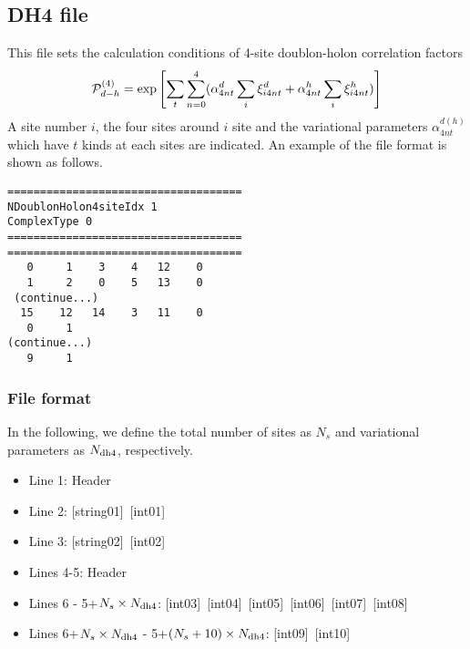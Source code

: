 \newpage
\subsection{DH4 file}
\label{Subsec:DH4}
This file sets the calculation conditions of 4-site doublon-holon correlation factors 
\begin{equation}
{\cal P}_{d-h}^{(4)}= \exp \left[ \sum_t \sum_{n=0}^4 (\alpha_{4nt}^d \sum_{i}\xi_{i4nt}^d+\alpha_{4nt}^h \sum_{i}\xi_{i4nt}^h)\right]
\end{equation}
A site number $i$, the four sites around $i$ site and the variational parameters $\alpha_{4nt}^{d(h)}$ which have $t$ kinds at each sites are indicated.
An example of the file format is shown as follows.

\begin{minipage}{12.5cm}
\begin{screen}
\begin{verbatim}
====================================
NDoublonHolon4siteIdx 1  
ComplexType 0
====================================
====================================
   0     1    3    4   12    0
   1     2    0    5   13    0
 (continue...)
  15    12   14    3   11    0
   0     1 
(continue...)
   9     1 
\end{verbatim}
\end{screen}
\end{minipage}

\subsubsection{File format}
In the following, we define the total number of sites as $N_s$ and variational parameters as $N_{\rm dh4}$, respectively.  
 \begin{itemize}
   \item  Line 1: Header
   \item  Line 2: [string01]~[int01]
   \item  Line 3: [string02]~[int02]
   \item  Lines 4-5:  Header
   \item  Lines 6 - 5+$N_s\times N_{\rm dh4}$: [int03]~[int04]~[int05]~[int06]~[int07]~[int08]
   \item  Lines 6+$N_s\times N_{\rm dh4}$ - 5+$(N_s+10) \times N_{\rm dh4}$: [int09]~[int10]
  \end{itemize}
